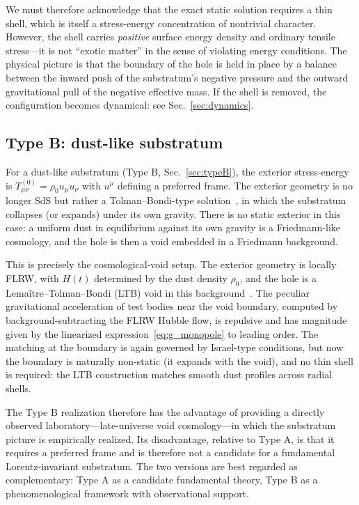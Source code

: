 \documentclass[%
  reprint,
  superscriptaddress,
  showpacs,
  showkeys,
  amsmath,amssymb,
  pra,
  longbibliography,
  floatfix,
  x11names
]{revtex4-2}
\begin{document}
We must therefore acknowledge that the exact static solution requires a thin shell, which is itself a stress-energy concentration of nontrivial character. However, the shell carries \emph{positive} surface energy density and ordinary tensile stress---it is not ``exotic matter'' in the sense of violating energy conditions. The physical picture is that the boundary of the hole is held in place by a balance between the inward push of the substratum's negative pressure and the outward gravitational pull of the negative effective mass. If the shell is removed, the configuration becomes dynamical: see Sec.~\ref{sec:dynamics}.

\subsection{Type B: dust-like substratum}
\label{sec:exact_typeB}

For a dust-like substratum (Type B, Sec.~\ref{sec:typeB}), the exterior stress-energy is $T^{(0)}_{\mu\nu} = \rho_0 u_\mu u_\nu$ with $u^\mu$ defining a preferred frame. The exterior geometry is no longer SdS but rather a Tolman--Bondi-type solution~\cite{tolman-1934,bondi-1947}, in which the substratum collapses (or expands) under its own gravity. There is no static exterior in this case: a uniform dust in equilibrium against its own gravity is a Friedmann-like cosmology, and the hole is then a void embedded in a Friedmann background.

This is precisely the cosmological-void setup. The exterior geometry is locally FLRW, with $H(t)$ determined by the dust density $\rho_0$, and the hole is a Lema\^itre--Tolman--Bondi (LTB) void in this background~\cite{shethvdw-2004,nadathur-2019}. The peculiar gravitational acceleration of test bodies near the void boundary, computed by background-subtracting the FLRW Hubble flow, is repulsive and has magnitude given by the linearized expression~\eqref{eq:g_monopole} to leading order. The matching at the boundary is again governed by Israel-type conditions, but now the boundary is naturally non-static (it expands with the void), and no thin shell is required: the LTB construction matches smooth dust profiles across radial shells.

The Type B realization therefore has the advantage of providing a directly observed laboratory---late-universe void cosmology---in which the substratum picture is empirically realized. Its disadvantage, relative to Type A, is that it requires a preferred frame and is therefore not a candidate for a fundamental Lorentz-invariant substratum. The two versions are best regarded as complementary: Type A as a candidate fundamental theory, Type B as a phenomenological framework with observational support.
\end{document}
